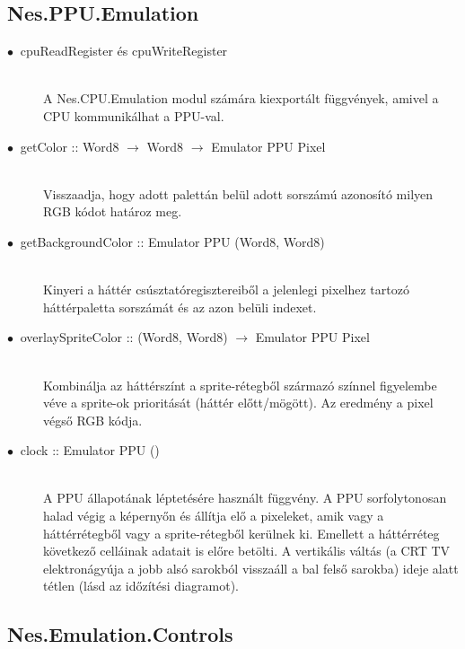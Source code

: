 \subsection{Nes.PPU.Emulation}

\begin{description}
	\item[$\bullet\:$ cpuReadRegister és cpuWriteRegister] \hfill \\
	A Nes.CPU.Emulation modul számára kiexportált függvények, amivel a CPU kommunikálhat a PPU-val.
	\item[$\bullet\:$ getColor :: Word8 $\rightarrow$ Word8 $\rightarrow$ Emulator PPU Pixel] \hfill \\
	Visszaadja, hogy adott palettán belül adott sorszámú azonosító milyen RGB kódot határoz meg.
	\item[$\bullet\:$ getBackgroundColor :: Emulator PPU (Word8, Word8)] \hfill \\
	Kinyeri a háttér csúsztatóregisztereiből a jelenlegi pixelhez tartozó háttérpaletta sorszámát és az azon belüli indexet.  
	\item[$\bullet\:$ overlaySpriteColor :: (Word8, Word8) $\rightarrow$ Emulator PPU Pixel] \hfill \\
	Kombinálja az háttérszínt a sprite-rétegből származó színnel figyelembe véve a sprite-ok prioritását (háttér előtt/mögött). Az eredmény a pixel végső RGB kódja.
	\item[$\bullet\:$ clock :: Emulator PPU ()] \hfill \\
	A PPU állapotának léptetésére használt függvény. A PPU sorfolytonosan halad végig a képernyőn és állítja elő a pixeleket, amik vagy a háttérrétegből vagy a sprite-rétegből kerülnek ki. Emellett a háttérréteg következő celláinak adatait is előre  betölti.
	A vertikális váltás (a CRT TV elektronágyúja a jobb alsó sarokból visszaáll a bal felső sarokba) ideje alatt tétlen (lásd az időzítési diagramot\cite{frametime}).
\end{description}

\subsection{Nes.Emulation.Controls}

